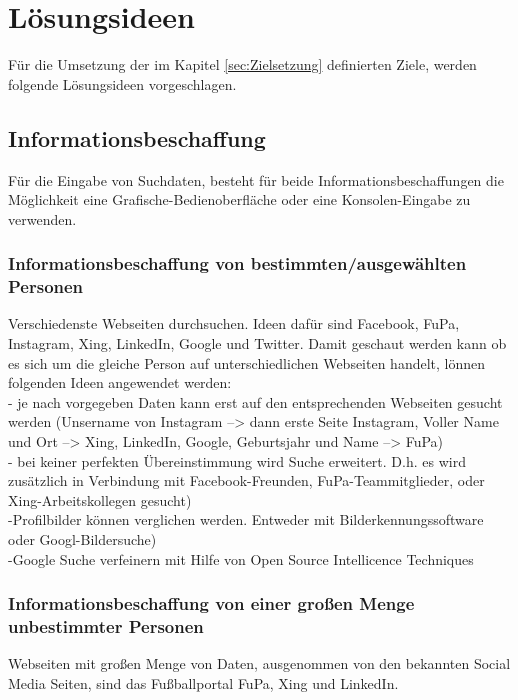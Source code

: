 
\chapter{Lösungsideen}  %
\label{cha:Lösungsideen} %
Für die Umsetzung der im Kapitel \ref{sec:Zielsetzung} definierten Ziele, werden folgende Lösungsideen vorgeschlagen.

\section{Informationsbeschaffung} %
Für die Eingabe von Suchdaten, besteht für beide Informationsbeschaffungen die Möglichkeit eine Grafische-Bedienoberfläche oder eine Konsolen-Eingabe zu verwenden.
	\subsection{Informationsbeschaffung von bestimmten/ausgewählten Personen}
	Verschiedenste Webseiten durchsuchen. Ideen dafür sind Facebook, FuPa, Instagram, Xing, LinkedIn, Google und Twitter. Damit geschaut werden kann ob es sich um die gleiche Person auf unterschiedlichen Webseiten handelt, lönnen folgenden Ideen angewendet werden:\\
		- je nach vorgegeben Daten kann erst auf den entsprechenden Webseiten gesucht werden (Unsername von Instagram --> dann erste Seite Instagram, Voller Name und Ort --> Xing, LinkedIn, Google, Geburtsjahr und Name --> FuPa)\\
		- bei keiner perfekten Übereinstimmung wird Suche erweitert. D.h. es wird zusätzlich in Verbindung mit Facebook-Freunden, FuPa-Teammitglieder, oder Xing-Arbeitskollegen gesucht)\\
		-Profilbilder können verglichen werden. Entweder mit Bilderkennungssoftware oder Googl-Bildersuche)\\
		-Google Suche verfeinern mit Hilfe von Open Source Intellicence Techniques
		
	\subsection{Informationsbeschaffung von einer großen Menge unbestimmter Personen}
	Webseiten mit großen Menge von Daten, ausgenommen von den bekannten Social Media Seiten, sind das Fußballportal FuPa, Xing und LinkedIn.
	
